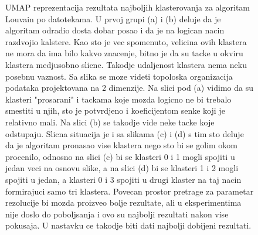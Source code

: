\documentclass{article}
\begin{document}
\begin{figure}[H]
    \centering
    \caption{ UMAP reprezentacija rezultata najboljih klasterovanja za algoritam Louvain po datotekama. U prvoj grupi (a) i (b) deluje da je algoritam odradio dosta dobar posao i da je na logican nacin razdvojio kalstere. Kao sto je vec spomenuto, velicina ovih klastera ne mora da ima bilo kakvo znacenje, bitno je da su tacke u okviru klastera medjusobno slicne. Takodje udaljenost klastera nema neku posebnu vaznost. Sa slika se moze videti topoloska organizacija podataka projektovana na 2 dimenzije. Na slici pod (a) vidimo da su klasteri "prosarani" i tackama koje mozda logicno ne bi trebalo smestiti u njih, sto je potvrdjeno i koeficijentom senke koji je relativno mali. Na slici (b) se takodje vide neke tacke koje odstupaju. Slicna situacija je i sa slikama (c) i (d) s tim sto deluje da je algoritam pronasao vise klastera nego sto bi se golim okom procenilo, odnosno na slici (c) bi se klasteri 0 i 1 mogli spojiti u jedan veci na osnovu slike, a na slici (d) bi se klasteri 1 i 2 mogli spojiti u jedan, a klasteri 0 i 3 spojiti u drugi klaster na taj nacin formirajuci samo tri klastera. Povecan prostor pretrage za parametar rezolucije bi mozda proizveo bolje rezultate, ali u eksperimentima nije doslo do poboljsanja i ovo su najbolji rezultati nakon vise pokusaja. U nastavku ce takodje biti dati najbolji dobijeni rezultati. }
    \label{fig:best_louvain}
\end{figure}
\end{document}
